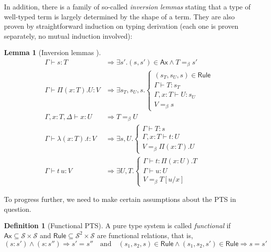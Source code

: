 \documentclass{article}
\newtheorem{lemma}{Lemma}
\theoremstyle{definition}
\newtheorem{definition}{Definition}
\theoremstyle{remark}
\begin{document}
In addition, there is a family of so-called
\textit{inversion lemmas} \cite{barendregt1992lambda,
vanbenthemjutting1993typing} stating that a type of
well-typed term is largely determined by the shape of a
term. They are also proven by straightforward induction
on typing derivation (each one is proven separately, no
mutual induction involved):

\begin{lemma}[Inversion lemmas ]\label{inversion}
\begin{align}
    \Gamma\vdash s:T &\Rightarrow
    \exists s'. (s,s')\in\mathsf{Ax} \land T =_\beta s'
    \\
    \Gamma\vdash\Pi(x:T).U:V &\Rightarrow
    \exists s_T,s_U,s.\left\{\begin{array}{l}
        (s_T,s_U,s)\in\mathsf{Rule} \\
        \Gamma\vdash T:s_T \\
        \Gamma,x:T\vdash U:s_U \\
        V =_\beta s
    \end{array}\right. \\
    \Gamma,x:T,\Delta\vdash x:U &\Rightarrow T=_\beta U
    \\
    \Gamma\vdash\lambda(x:T).t:V &\Rightarrow
    \exists s,U.\left\{\begin{array}{l}
        \Gamma\vdash T:s \\
        \Gamma,x:T\vdash t:U \\
        V =_\beta \Pi(x:T).U
    \end{array}\right. \\
    \Gamma\vdash t\,u:V &\Rightarrow
    \exists U,T.\left\{\begin{array}{l}
        \Gamma\vdash t:\Pi(x:U).T \\
        \Gamma\vdash u:U \\
        V =_\beta T[u/x]
    \end{array}\right.
\end{align}
\end{lemma}

To progress further, we need to make certain
assumptions about the PTS in question.

\begin{definition}[Functional PTS]
    A pure type system is called \emph{functional} if
    $\mathsf{Ax}\subseteq\mathcal{S}\times\mathcal{S}$
    and $\mathsf{Rule}\subseteq\mathcal{S}^2\times
    \mathcal{S}$ are functional relations, that is,
    \[
        (s:s')\land(s:s'')\Rightarrow s'=s''
        \quad\text{and}\quad
        (s_1,s_2,s)\in\mathsf{Rule}\land(s_1,s_2,s')\in
        \mathsf{Rule}\Rightarrow s=s'
    \]
\end{definition}
\end{document}
